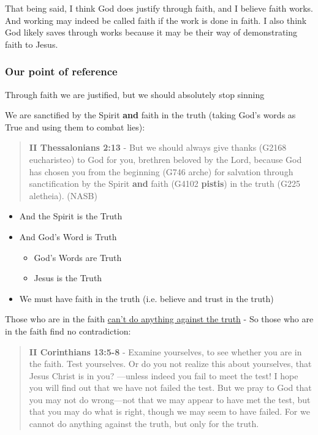 \documentclass[11pt]{article}
\begin{document}
That being said, I think God does justify through faith, and I believe faith works. And working may indeed be called faith if the work is done in faith.
I also think God likely saves through works because it may be their way of demonstrating faith to Jesus.

\subsubsection{Our point of reference}
\label{sec:org029fee9}

Through faith we are justified, but we should absolutely stop sinning

We are sanctified by the Spirit \textbf{and} faith in the truth (taking God's words as True and using them to combat lies):

\begin{quote}
\textbf{II Thessalonians 2:13} - But we should always give thanks (G2168 eucharisteo) to God for you, brethren beloved by the Lord, because God has chosen you from the beginning (G746 arche) for salvation through sanctification by the Spirit \textbf{and} faith (G4102 \textbf{pistis}) in the truth (G225 aletheia). (NASB)
\end{quote}

\begin{itemize}
\item And the Spirit is the Truth
\item And God's Word is Truth
\begin{itemize}
\item God's Words are Truth
\item Jesus is the Truth
\end{itemize}
\item We must have faith in the truth (i.e. believe and trust in the truth)
\end{itemize}

Those who are in the faith \uline{can't do anything against the truth} - So those who are in the faith find no contradiction:

\begin{quote}
\textbf{II Corinthians 13:5-8} - Examine yourselves, to see whether you are in the faith. Test yourselves. Or do you not realize this about yourselves, that Jesus Christ is in you? —unless indeed you fail to meet the test! I hope you will find out that we have not failed the test. But we pray to God that you may not do wrong—not that we may appear to have met the test, but that you may do what is right, though we may seem to have failed. For we cannot do anything against the truth, but only for the truth.
\end{quote}
\end{document}
